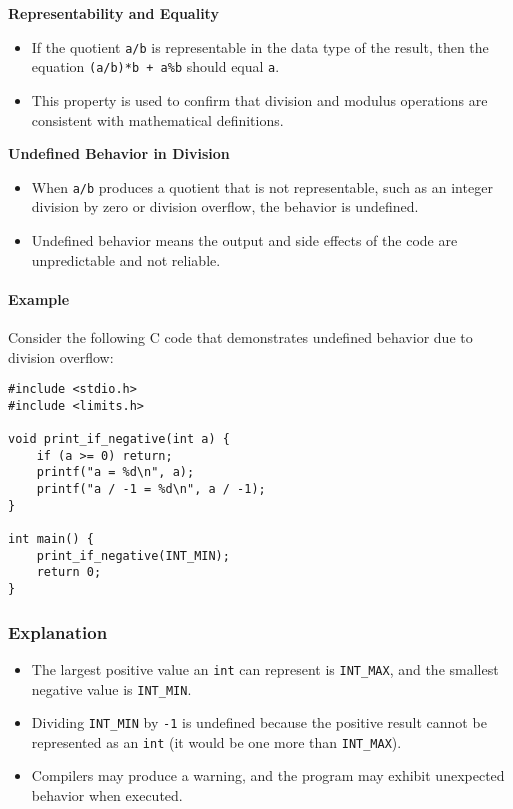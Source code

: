 \documentclass[12pt]{article}
\begin{document}
\textbf{Representability and Equality}
\begin{itemize}
    \item If the quotient \texttt{a/b} is representable in the data type of the result, then the equation \texttt{(a/b)*b + a\%b} should equal \texttt{a}.
    \item This property is used to confirm that division and modulus operations are consistent with mathematical definitions.
\end{itemize}

\textbf{Undefined Behavior in Division}
\begin{itemize}
    \item When \texttt{a/b} produces a quotient that is not representable, such as an integer division by zero or division overflow, the behavior is undefined.
    \item Undefined behavior means the output and side effects of the code are unpredictable and not reliable.
\end{itemize}

\paragraph{Example}
Consider the following C code that demonstrates undefined behavior due to division overflow:

\begin{verbatim}
#include <stdio.h>
#include <limits.h>

void print_if_negative(int a) {
    if (a >= 0) return;
    printf("a = %d\n", a);
    printf("a / -1 = %d\n", a / -1);
}

int main() {
    print_if_negative(INT_MIN);
    return 0;
}
\end{verbatim}

\subsubsection{Explanation}
\begin{itemize}
    \item The largest positive value an \texttt{int} can represent is \texttt{INT\_MAX}, and the smallest negative value is \texttt{INT\_MIN}.
    \item Dividing \texttt{INT\_MIN} by \texttt{-1} is undefined because the positive result cannot be represented as an \texttt{int} (it would be one more than \texttt{INT\_MAX}).
    \item Compilers may produce a warning, and the program may exhibit unexpected behavior when executed.
\end{itemize}
\end{document}
